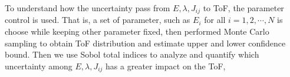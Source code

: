 \documentclass[letterpaper,12pt]{article}
\begin{document}

To understand how the uncertainty pass from $E, \lambda, J_{ij}$ to ToF, the parameter control is used. That is, a set of parameter, such as $E_i$ for all $i=1,2,\cdots,N$ is choose while keeping other parameter fixed, then performed Monte Carlo sampling to obtain ToF distribution and estimate upper and lower confidence bound.
Then we use Sobol total indices to analyze and quantify 
which uncertainty among $E, \lambda, J_{ij}$ has a greater impact on the ToF, 
\end{document}

